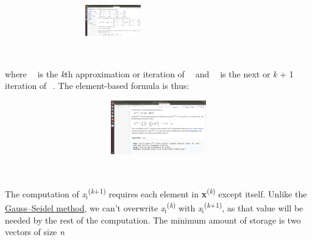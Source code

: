 \documentclass[a4paper]{article}
\newcommand\textsubscript[1]{\ensuremath{{}_{\text{#1}}}}
\begin{document}
\begin{center}
\includegraphics[width=9.409cm,height=1.358cm]{csn221Report-img004.png}
\end{center}
 \includegraphics[width=0.041cm,height=0.041cm]{csn221Report-img003.png} 


\bigskip

where  \includegraphics[width=0.041cm,height=0.041cm]{csn221Report-img003.png} \ is the \textit{k}th approximation or
iteration of  \includegraphics[width=0.041cm,height=0.041cm]{csn221Report-img003.png} \ and 
\includegraphics[width=0.041cm,height=0.041cm]{csn221Report-img003.png} \ is the next or \textit{k} + 1 iteration of 
\includegraphics[width=0.041cm,height=0.041cm]{csn221Report-img003.png} . The element-based formula is thus: 



\begin{center}
\includegraphics[width=14.658cm,height=2.334cm]{csn221Report-img005.png}
\end{center}
 \includegraphics[width=0.041cm,height=0.041cm]{csn221Report-img003.png} 


\bigskip

The computation of
\textit{x}\textit{\textsubscript{i}}\textsuperscript{(}\textit{\textsuperscript{k}}\textsuperscript{+1)} requires each
element in \textbf{x}\textsuperscript{(}\textit{\textsuperscript{k}}\textsuperscript{)} except itself. Unlike the
\href{https://en.wikipedia.org/wiki/Gauss?Seidel_method}{Gauss--Seidel method}, we can't overwrite
\textit{x}\textit{\textsubscript{i}}\textsuperscript{(}\textit{\textsuperscript{k}}\textsuperscript{)} with
\textit{x}\textit{\textsubscript{i}}\textsuperscript{(}\textit{\textsuperscript{k}}\textsuperscript{+1)}, as that value
will be needed by the rest of the computation. The minimum amount of storage is two vectors of size \textit{n}
\end{document}
